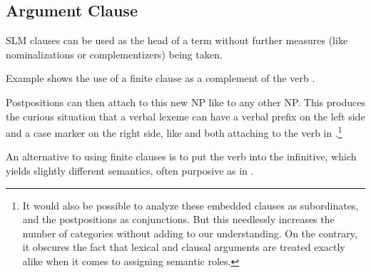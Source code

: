 \subsection{Argument Clause}\label{sec:nppp:ArgumentClause}
SLM clauses can be used as the head of a term without further measures (like nominalizations or complementizers) being taken.


Example  shows the use of a finite clause as a complement of the verb .


Postpositions can then attach to this new NP like to any other NP. This produces the curious situation that a verbal lexeme can have a verbal prefix on the left side and a case marker on the right side, like   and  both attaching to the verb  in  .\footnote{It would also be possible to analyze these embedded clauses as subordinates, and the postpositions as conjunctions. But this needlessly increases the number of categories without adding to our understanding. On the contrary, it obscures the fact that lexical and clausal arguments are treated exactly alike when it comes to assigning semantic roles.}

An alternative to using finite clauses is to put the verb into the infinitive, which yields slightly different semantics, often purposive as in .




